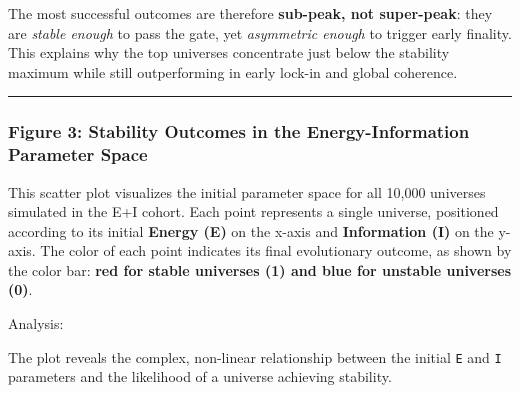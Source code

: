 The most successful outcomes are therefore \textbf{sub-peak, not
super-peak}: they are \emph{stable enough} to pass the gate, yet
\emph{asymmetric enough} to trigger early finality. This explains why
the top universes concentrate just below the stability maximum while
still outperforming in early lock-in and global coherence.

\begin{center}\rule{0.5\linewidth}{0.5pt}\end{center}

\subsubsection{Figure 3: Stability Outcomes in the Energy-Information
Parameter
Space}\label{figure-3-stability-outcomes-in-the-energy-information-parameter-space}

This scatter plot visualizes the initial parameter space for all 10,000
universes simulated in the E+I cohort. Each point represents a single
universe, positioned according to its initial \textbf{Energy (E)} on the
x-axis and \textbf{Information (I)} on the y-axis. The color of each
point indicates its final evolutionary outcome, as shown by the color
bar: \textbf{red for stable universes (1) and blue for unstable
universes (0)}.

Analysis:

The plot reveals the complex, non-linear relationship between the
initial \texttt{E} and \texttt{I} parameters and the likelihood of a
universe achieving stability.

